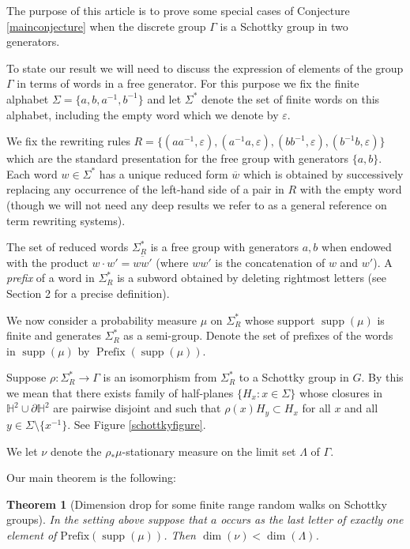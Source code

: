 \documentclass{article}
\newtheorem{maintheorem}{Theorem}
\renewcommand{\H}{\mathbb{H}}
\DeclareMathOperator{\supp}{supp}
\DeclareMathOperator{\prefix}{Prefix}
\begin{document}
The purpose of this article is to prove some special cases of Conjecture \ref{mainconjecture} when the discrete group \(\Gamma\) is a Schottky group in two generators.

To state our result we will need to discuss the expression of elements of the group \(\Gamma\) in terms of words in a free generator.  For this purpose we fix the finite alphabet \(\Sigma = \lbrace a,b,a^{-1},b^{-1}\rbrace\) and let \(\Sigma^*\) denote the set of finite words on this alphabet, including the empty word which we denote by \(\varepsilon\).

We fix the rewriting rules \(R = \lbrace (aa^{-1},\varepsilon),(a^{-1}a,\varepsilon), (bb^{-1},\varepsilon),(b^{-1}b,\varepsilon)\rbrace\) which are the standard presentation for the free group with generators \(\lbrace a,b\rbrace\). Each word \(w \in \Sigma^*\) has a unique reduced form \(\overline{w}\) which is obtained by successively replacing any occurrence of the left-hand side of a pair in \(R\) with the empty word (though we will not need any deep results we refer to \cite{rewriting} as a general reference on term rewriting systems).

The set of reduced words \(\Sigma^*_R\) is a free group with generators \(a,b\) when endowed with the product \(w\cdot w' = \overline{ww'}\) (where \(ww'\) is the concatenation of \(w\) and \(w'\)). A \textit{prefix} of a word in $\Sigma^*_R$ is a subword obtained by deleting rightmost letters (see Section 2 for a precise definition).

We now consider a probability measure \(\mu\) on \(\Sigma^*_R\) whose support \(\supp(\mu)\) is finite and generates \(\Sigma^*_R\) as a semi-group. Denote the
set of prefixes of the words in \(\supp(\mu)\) by \(\prefix(\supp(\mu))\).

Suppose \(\rho:\Sigma^*_R \to \Gamma\) is an isomorphism from \(\Sigma^*_R\) to a Schottky group in \(G\). By this we mean that there exists family of half-planes \(\lbrace H_x: x \in \Sigma\rbrace\) whose closures in \(\H^2 \cup \partial \H^2\) are pairwise disjoint and such that \(\rho(x)H_y \subset H_x\) for all \(x\) and all \(y \in \Sigma \setminus \lbrace x^{-1}\rbrace\).  See Figure \ref{schottkyfigure}.


We let \(\nu\) denote the \(\rho_*\mu\)-stationary measure on the limit set \(\Lambda\) of \(\Gamma\). 

Our main theorem is the following:
\begin{maintheorem}[Dimension drop for some finite range random walks on Schottky groups]\label{maintheorem}
In the setting above suppose that \(a\) occurs as the last letter of exactly one element of \(\text{Prefix}(\supp(\mu))\). Then \(\dim(\nu) < \dim(\Lambda)\).
\end{maintheorem}
\end{document}
